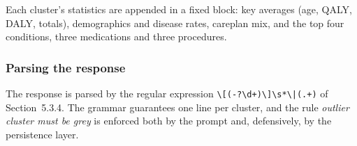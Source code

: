 Each cluster's statistics are appended in a fixed block: key averages (age, QALY, DALY, totals), demographics and disease rates, careplan mix, and the top four conditions, three medications and three procedures.

\subsubsection*{Parsing the response}

The response is parsed by the regular expression \texttt{\textbackslash[(-?\textbackslash d+)\textbackslash]\textbackslash s*\textbackslash|(.+)} of Section~5.3.4. The grammar guarantees one line per cluster, and the rule \emph{outlier cluster must be grey} is enforced both by the prompt and, defensively, by the persistence layer.
